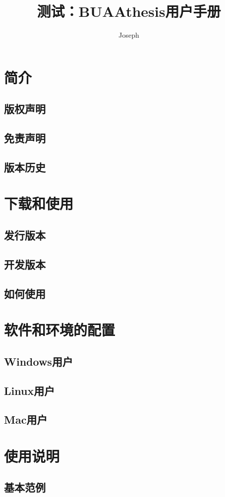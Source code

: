\documentclass[bachelor,openright]{buaathesis}
\title{测试：BUAAthesis用户手册}
\author{Joseph}
\begin{document}
\maketitle
\frontmatter
\tableofcontents
\mainmatter
\chapter{简介}
	\section{版权声明}
	\section{免责声明}
	\section{版本历史}
\chapter{下载和使用}
	\section{发行版本}
	\section{开发版本}
	\section{如何使用}
\chapter{软件和环境的配置}
	\section{Windows用户}
	\section{Linux用户}
	\section{Mac用户}
\chapter{使用说明}
	\section{基本范例}
\end{document}
